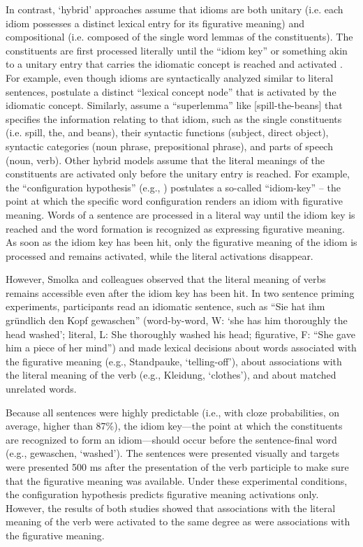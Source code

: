\documentclass[output=paper]{langsci/langscibook}
\begin{document}
In contrast, ‘hybrid’ approaches assume that idioms are both unitary (i.e. each idiom possesses a distinct lexical entry for its figurative meaning) and compositional (i.e. composed of the single word lemmas of the constituents). The constituents are first processed literally until the “idiom key” or something akin to a unitary entry that carries the idiomatic concept is reached and activated \citep{cacciari:1988,caillies:2007,connine:1992,cutting:1997,gibbs:1989,holsinger:2013,sprenger:2006,titone:1999}. For example, even though idioms are syntactically analyzed similar to literal sentences, \citet{cutting:1997} postulate a distinct “lexical concept node” that is activated by the idiomatic concept. Similarly, \citet{sprenger:2006} assume a “superlemma” like [spill-the-beans] that specifies the information relating to that idiom, such as the single constituents (i.e. spill, the, and beans), their syntactic functions (subject, direct object), syntactic categories (noun phrase, prepositional phrase), and parts of speech (noun, verb). Other hybrid models assume that the literal meanings of the constituents are activated only before the unitary entry is reached. For example, the “configuration hypothesis” (e.g., \citet{cacciari:1988}) postulates a so-called “idiom-key” – the point at which the specific word configuration renders an idiom with figurative meaning. Words of a sentence are processed in a literal way until the idiom key is reached and the word formation is recognized as expressing figurative meaning. As soon as the idiom key has been hit, only the figurative meaning of the idiom is processed and remains activated, while the literal activations disappear. 

However, Smolka and colleagues \citep{rabanus:2008,smolka:2007} observed that the literal meaning of verbs remains accessible even after the idiom key has been hit. In two sentence priming experiments, participants read an idiomatic sentence, such as ``Sie hat ihm gründlich den Kopf gewaschen'' (word-by-word, W: ‘she has him thoroughly the head washed’; literal, L: She thoroughly washed his head; figurative, F: “She gave him a piece of her mind”) and made lexical decisions about words associated with the figurative meaning (e.g., Standpauke, ‘telling-off’), about associations with the literal meaning of the verb (e.g., Kleidung, ‘clothes’), and about matched unrelated words. 

Because all sentences were highly predictable (i.e., with cloze probabilities, on average, higher than 87\%), the idiom key—the point at which the constituents are recognized to form an idiom—should occur before the sentence-final word (e.g., gewaschen, ‘washed’). The sentences were presented visually and targets were presented 500 ms after the presentation of the verb participle to make sure that the figurative meaning was available. Under these experimental conditions, the configuration hypothesis \citep{cacciari:1988} predicts figurative meaning activations only.  However, the results of both studies showed that associations with the literal meaning of the verb were activated to the same degree as were associations with the figurative meaning.  
\end{document}
